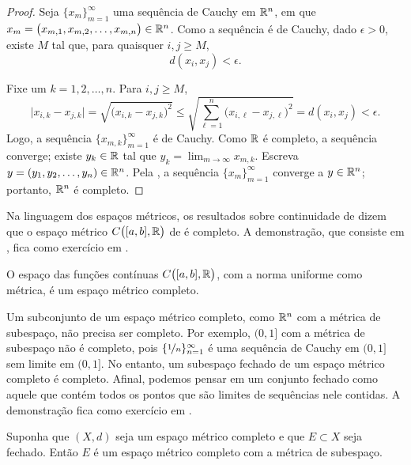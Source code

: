 \begin{proof}
Seja $\{ x_m \}_{m=1}^\infty$ uma sequência de Cauchy
em ${\mathbb{R}}^n$, em que $x_m = \bigl(x_{m,1},x_{m,2},\ldots,x_{m,n}\bigr) \in {\mathbb{R}}^n$.
Como a sequência é de Cauchy, dado $\epsilon > 0$, existe $M$ tal que, para
quaisquer $i,j \geq M$,
\begin{equation*}
d(x_i,x_j) < \epsilon.
\end{equation*}

Fixe um $k=1,2,\ldots,n$. Para $i,j \geq M$,
\begin{equation*}
\bigl\lvert x_{i,k} - x_{j,k} \bigr\rvert
=
\sqrt{{\bigl(x_{i,k} - x_{j,k}\bigr)}^2}
\leq
\sqrt{\sum_{\ell=1}^n {\bigl(x_{i,\ell}-x_{j,\ell}\bigr)}^2}
= d(x_i,x_j) < \epsilon .
\end{equation*}
Logo, a sequência $\{ x_{m,k} \}_{m=1}^\infty$ é de Cauchy. Como ${\mathbb{R}}$ é
completo, a sequência converge; existe $y_k \in {\mathbb{R}}$ tal que
$y_k = \lim_{m\to\infty} x_{m,k}$.
Escreva $y = (y_1,y_2,\ldots,y_n) \in {\mathbb{R}}^n$.
Pela , a sequência $\{ x_m \}_{m=1}^\infty$ converge
a $y \in {\mathbb{R}}^n$; portanto, ${\mathbb{R}}^n$ é completo.
\end{proof}

Na linguagem dos espaços métricos,
os resultados sobre continuidade de 
dizem que o espaço métrico
$C\bigl([a,b],{\mathbb{R}}\bigr)$ de  é completo.
A demonstração, que consiste em ,
fica como exercício em .

\begin{prop} \label{prop:CabRcomplete}
O espaço das funções contínuas $C\bigl([a,b],{\mathbb{R}}\bigr)$, com a norma
uniforme como métrica, é um espaço métrico completo.
\end{prop}

Um subconjunto de um espaço métrico completo, como ${\mathbb{R}}^n$ com a métrica de
subespaço, não precisa ser completo. Por exemplo, $(0,1]$ com a métrica de
subespaço não é completo, pois $\{ \nicefrac{1}{n} \}_{n=1}^\infty$ é uma
sequência de Cauchy em $(0,1]$ sem limite em $(0,1]$.
No entanto, um subespaço fechado de um espaço métrico completo é completo.
Afinal, podemos pensar em um conjunto fechado como aquele que contém todos
os pontos que são limites de sequências nele contidas.
A demonstração fica como exercício em .

\begin{prop} \label{prop:closedcomplete}
Suponha que $(X,d)$ seja um espaço métrico completo e que $E \subset X$
seja fechado.
Então $E$ é um espaço métrico completo com a métrica de subespaço.
\end{prop}

